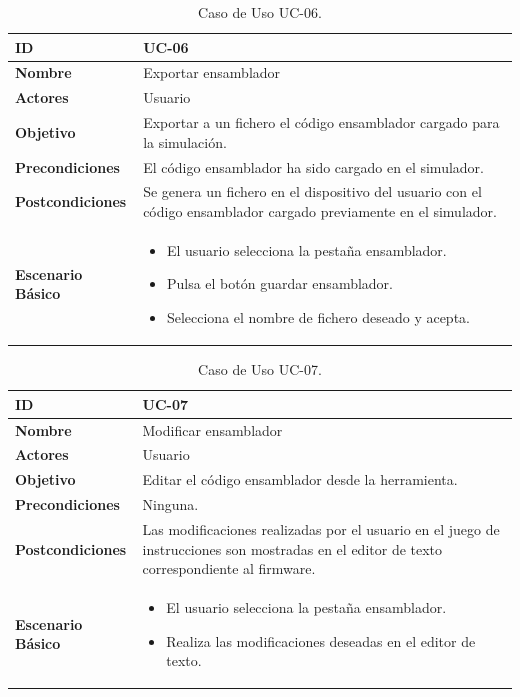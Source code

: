 \begin{center}
\begin{table}[htbp]
\centering
\begin{tabular}{@{}p{2.5cm} p{9cm}@{}} 
\toprule
\textbf{ID}	& UC-06  \\
\midrule
\textbf{Nombre} 		& Exportar ensamblador   \\
\midrule
\textbf{Actores} 		&	Usuario  \\
\midrule
\textbf{Objetivo} 	&	Exportar a un fichero el código ensamblador cargado para la simulación. 	 \\
\midrule
\textbf{Precondiciones}	&	El código ensamblador ha sido cargado en el simulador.   \\
\midrule
\textbf{Postcondiciones} 	& Se genera un fichero en el dispositivo del usuario con el código ensamblador cargado previamente en el simulador.   \\
\midrule
\textbf{Escenario Básico} 	&  \begin{itemize}
\item El usuario selecciona la pestaña ensamblador.
\item Pulsa el botón guardar ensamblador.
\item Selecciona el nombre de fichero deseado y acepta.
\end{itemize} \\
\bottomrule
\end{tabular}
\caption{Caso de Uso UC-06.}
\label{tab:uc06}
\end{table}
\end{center}

\begin{center}
\begin{table}[htbp]
\centering
\begin{tabular}{@{}p{2.5cm} p{9cm}@{}} 
\toprule
\textbf{ID}	& UC-07  \\
\midrule
\textbf{Nombre} 		& Modificar ensamblador   \\
\midrule
\textbf{Actores} 		&	Usuario  \\
\midrule
\textbf{Objetivo} 	&	Editar el código ensamblador desde la herramienta. 	 \\
\midrule
\textbf{Precondiciones}	&	Ninguna.   \\
\midrule
\textbf{Postcondiciones} 	& Las modificaciones realizadas por el usuario en el juego de instrucciones son mostradas en el editor de texto correspondiente al firmware.   \\
\midrule
\textbf{Escenario Básico} 	&  \begin{itemize}
\item El usuario selecciona la pestaña ensamblador.
\item Realiza las modificaciones deseadas en el editor de texto.
\end{itemize} \\
\bottomrule
\end{tabular}
\caption{Caso de Uso UC-07.}
\label{tab:uc07}
\end{table}
\end{center}

